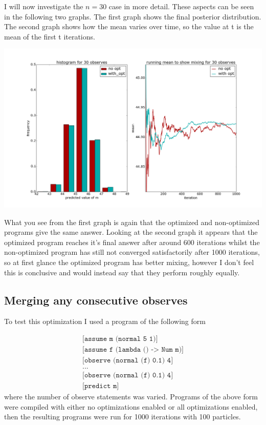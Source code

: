 \documentclass[a4paper]{article}
\begin{document}
I will now investigate the \(n = 30\) case in more detail. These aspects can be seen in the following two graphs. The first graph shows the final posterior distribution. The second graph shows how the mean varies over time, so the value at t is the mean of the first t iterations.

\centerline{\includegraphics[width=16cm]{images/merging_observes_2.png}}

What you see from the first graph is again that the optimized and non-optimized programs give the same answer. Looking at the second graph it appears that the optimized program reaches it's final answer after around 600 iterations whilst the non-optimized program has still not converged satisfactorily after 1000 iterations, so at first glance the optimized program has better mixing, however I don't feel this is conclusive and would instead say that they perform roughly equally.




\subsection{Merging any consecutive observes}

To test this optimization I used a program of the following form

\[
	\begin{array}{l}
		\texttt{[assume m (normal 5 1)]} \\
		\texttt{[assume f (lambda () -> Num m)]} \\
		\texttt{[observe (normal (f) 0.1) 4]} \\
		\texttt{...} \\
		\texttt{[observe (normal (f) 0.1) 4]} \\
		\texttt{[predict m]}
	\end{array}
\]
where the number of observe statements was varied. Programs of the above form were compiled with either no optimizations enabled or all optimizations enabled, then the resulting programs were run for 1000 iterations with 100 particles.
\end{document}
